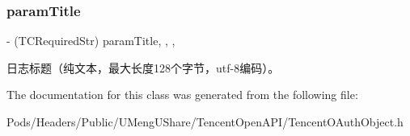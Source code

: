 \subsubsection{\texorpdfstring{param\+Title}{paramTitle}}
{\footnotesize\ttfamily -\/ (T\+C\+Required\+Str) param\+Title\hspace{0.3cm}{\ttfamily [read]}, {\ttfamily [write]}, {\ttfamily [nonatomic]}, {\ttfamily [retain]}}

日志标题（纯文本，最大长度128个字节，utf-\/8编码）。 

The documentation for this class was generated from the following file\+:\begin{DoxyCompactItemize}
\item 
Pods/\+Headers/\+Public/\+U\+Meng\+U\+Share/\+Tencent\+Open\+A\+P\+I/Tencent\+O\+Auth\+Object.\+h\end{DoxyCompactItemize}
